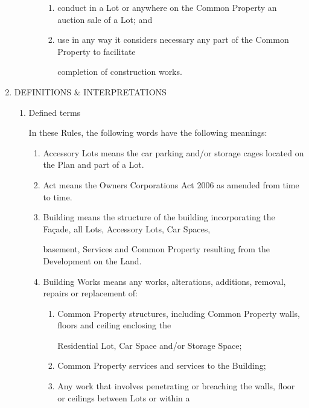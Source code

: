 \documentclass{article}
\begin{document}
\begin{enumerate}[label=\arabic*.]
\begin{enumerate}[label=\arabic{enumi}.\arabic*.]
\begin{enumerate}[label=(\arabic*)]
\begin{enumerate}[label=(\alph*)]
\item  conduct in a Lot or anywhere on the Common Property an auction sale of a Lot; and 

\item  use in any way it considers necessary any part of the Common Property to facilitate 

completion of construction works. 

\end{enumerate}
\end{enumerate}
\end{enumerate}
\item  DEFINITIONS \& INTERPRETATIONS 

\begin{enumerate}[label=\arabic{enumi}.\arabic*.]
\item  Defined terms 

In these Rules, the following words have the following meanings: 

\begin{enumerate}[label=(\arabic*)]
\item  Accessory Lots means the car parking and/or storage cages located on the Plan and part of a Lot. 

\item  Act means the Owners Corporations Act 2006 as amended from time to time. 

\item  Building means the structure of the building incorporating the Façade, all Lots, Accessory Lots, Car Spaces, 

basement, Services and Common Property resulting from the Development on the Land.  

\item  Building Works means any works, alterations, additions, removal, repairs or replacement of: 

\begin{enumerate}[label=(\alph*)]
\item  Common Property structures, including Common Property walls, floors and ceiling enclosing the 

Residential Lot, Car Space and/or Storage Space; 

\item  Common Property services and services to the Building; 

\item  Any work that involves penetrating or breaching the walls, floor or ceilings between Lots or within a 


\end{enumerate}
\end{enumerate}
\end{enumerate}
\end{enumerate}
\end{document}
